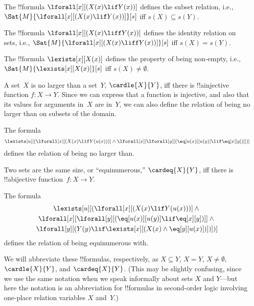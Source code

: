 \documentclass[../../../include/open-logic-section]{subfiles}
\begin{document}

\begin{prop}
The !!{formula} $\lforall[x][(X(x) \lif Y(x))]$ defines the subset
relation, i.e., $\Sat{M}{\lforall[x][(X(x) \lif Y(x))]}[s]$ iff $s(X)
\subseteq s(Y)$.
\end{prop}

\begin{prop}
The !!{formula} $\lforall[x][(X(x) \liff Y(x))]$ defines the identity
relation on sets, i.e., $\Sat{M}{\lforall[x][(X(x) \liff Y(x))]}[s]$
iff $s(X) = s(Y)$.
\end{prop}

\begin{prop}
The !!{formula} $\lexists[x][X(x)]$ defines the property of being
non-empty, i.e., $\Sat{M}{\lexists[x][X(x)]}[s]$ iff $s(X) \neq
\emptyset$.
\end{prop}

A set~$X$ is no larger than a set~$Y$, $\cardle{X}{Y}$, iff there is
!!a{injective} function $f\colon X \to Y$.  Since we can express that
a function is injective, and also that its values for arguments in~$X$
are in~$Y$, we can also define the relation of being no larger than on
subsets of the domain.

\begin{prop}
The formula
\[
\lexists[u][(\lforall[x][(X(x) \lif Y(u(x)))] \land \lforall[x][\lforall[y][(\eq[u(x)][u(y)] \lif
      \eq[x][y])]])]
\]
defines the relation of being no larger than.
\end{prop}

Two sets are the same size, or ``equinumerous,'' $\cardeq{X}{Y}$, iff
there is !!a{bijective} function~$f\colon X \to Y$.

\begin{prop}
The formula
\begin{multline*}
  \lexists[u][(\lforall[x][(X(x) \lif Y(u(x)))] \land {}\\
    \lforall[x][\lforall[y][(\eq[u(x)][u(y)] \lif \eq[x][y])]]
  \land {} \\\lforall[y][(Y(y) \lif \lexists[x][(X(x)
      \land \eq[y][u(x)])])])]
\end{multline*}
defines the relation of being equinumerous with.
\end{prop}

We will abbreviate these !!{formula}s, respectively, as $X \subseteq Y$,
$X = Y$, $X \neq \emptyset$, $\cardle{X}{Y}$, and
$\cardeq{X}{Y}$. (This may be slightly confusing, since we use the
same notation when we speak informally about sets $X$ and $Y$---but
here the notation is an abbreviation for !!{formula}s in second-order
logic involving one-place relation variables $X$ and~$Y$.)
\end{document}
